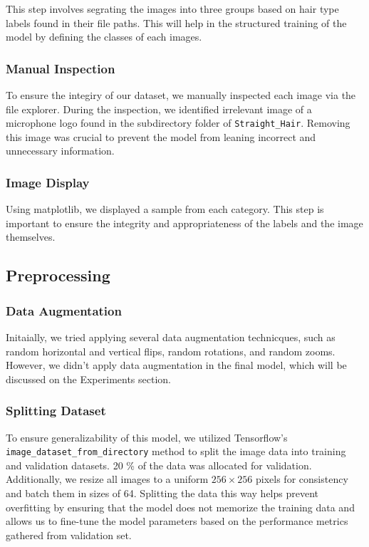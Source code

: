 This step involves segrating the images into three groups based on hair type labels found in their file paths. This will help in the structured training of the model by defining the classes of each images.

\subsubsection{Manual Inspection}

To ensure the integiry of our dataset, we manually inspected each image via the file explorer. During the inspection, we identified irrelevant image of a microphone logo found in the subdirectory folder of \texttt{Straight\_Hair}. Removing this image was crucial to prevent the model from leaning incorrect and unnecessary information.

\subsubsection{Image Display}

Using matplotlib, we displayed a sample from each category. This step is important to ensure the integrity and appropriateness of the labels and the image themselves.

\subsection{Preprocessing}

\subsubsection{Data Augmentation}

Initaially, we tried applying several data augmentation technicques, such as random horizontal and vertical flips, random rotations, and random zooms. However, we didn't apply data augmentation in the final model, which will be discussed on the Experiments section.

\subsubsection{Splitting Dataset}

To ensure generalizability of this model, we utilized Tensorflow's \texttt{image\_dataset\_from\_directory} method to split the image data into training and validation datasets. 20 \% of the data was allocated for validation. Additionally, we resize all images to a uniform \(256 \times 256\) pixels for consistency and batch them in sizes of 64. Splitting the data this way helps prevent overfitting by ensuring that the model does not memorize the training data and allows us to fine-tune the model parameters based on the performance metrics gathered from validation set.

